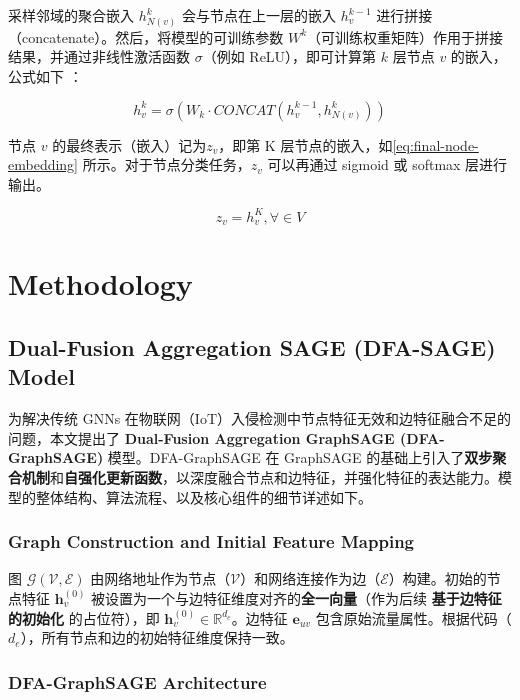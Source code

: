 \documentclass{article}
\begin{document}
采样邻域的聚合嵌入 $h_{N(v)}^k$ 会与节点在上一层的嵌入 $h_v^{k-1}$ 进行拼接（concatenate）。然后，将模型的可训练参数 $W^k$（可训练权重矩阵）作用于拼接结果，并通过非线性激活函数 $\sigma$（例如 ReLU），即可计算第 $k$ 层节点 $v$ 的嵌入，公式如下 \cite{hamilton2018inductiverepresentationlearninglarge}：

\begin{equation}
 h_v^k=\sigma ( W_k \cdot CONCAT (h_v^{k-1},h_{N(v)}^k) )
\end{equation}

节点 $v$ 的最终表示（嵌入）记为$z_v$，即第 K 层节点的嵌入，如\eqref{eq:final-node-embedding} 所示。对于节点分类任务，$z_v$ 可以再通过 sigmoid 或 softmax 层进行输出。

\begin{equation}
 z_v=h_v^K, \forall \in V
 \label{eq:final-node-embedding}
\end{equation}
\section{Methodology}

\subsection{Dual-Fusion Aggregation SAGE (DFA-SAGE) Model}

为解决传统 GNNs 在物联网（IoT）入侵检测中节点特征无效和边特征融合不足的问题，本文提出了 \textbf{Dual-Fusion Aggregation GraphSAGE (DFA-GraphSAGE)} 模型。DFA-GraphSAGE 在 GraphSAGE 的基础上引入了\textbf{双步聚合机制}和\textbf{自强化更新函数}，以深度融合节点和边特征，并强化特征的表达能力。模型的整体结构、算法流程、以及核心组件的细节详述如下。


\subsubsection{Graph Construction and Initial Feature Mapping}

图 $\mathcal{G}(\mathcal{V}, \mathcal{E})$ 由网络地址作为节点（$\mathcal{V}$）和网络连接作为边（$\mathcal{E}$）构建。初始的节点特征 $\mathbf{h}_v^{(0)}$ 被设置为一个与边特征维度对齐的\textbf{全一向量}（作为后续 \textbf{基于边特征的初始化} 的占位符），即 $\mathbf{h}_v^{(0)} \in \mathbb{R}^{d_{e}}$。边特征 $\mathbf{e}_{uv}$ 包含原始流量属性。根据代码（$d_{e}$），所有节点和边的初始特征维度保持一致。

\subsubsection{DFA-GraphSAGE Architecture} 
\end{document}

